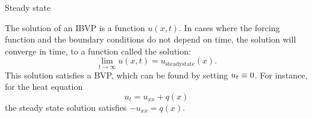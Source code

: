  {Steady state}
\label{app:steadystate}

The solution of an \ac{IBVP} is a function $u(x,t)$. In cases where
the forcing function and the boundary conditions do not depend on
time, the solution will converge in time, to a function called the
 solution:
\[ \lim_{t\rightarrow\infty} u(x,t)=u_{\mathrm{steady state}}(x). \]
This solution satisfies a \ac{BVP}, which can be found by setting
$u_t\equiv\nobreak0$. For instance, for the heat equation \[
u_t=u_{xx}+q(x) \] the steady state solution satisfies $-u_{xx}=q(x)$.


